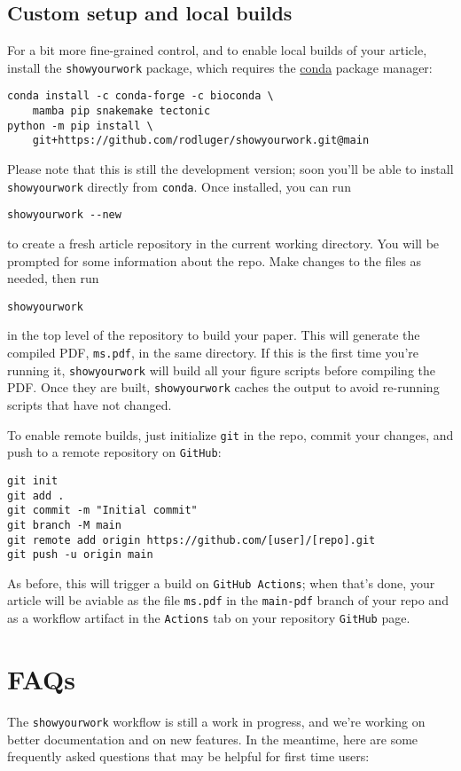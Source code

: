 \documentclass[twocolumn]{aastex631}
\begin{document}
{{\subsection{Custom setup and local builds}
%
For a bit more fine-grained control, and to enable local builds of your article, install the \texttt{showyourwork} package, which requires the \href{https://www.anaconda.com/products/individual}{conda} package manager:
%
\begin{verbatim}
conda install -c conda-forge -c bioconda \
    mamba pip snakemake tectonic
python -m pip install \
    git+https://github.com/rodluger/showyourwork.git@main
\end{verbatim}
%
Please note that this is still the development version; soon you'll be able to install \texttt{showyourwork} directly from \texttt{conda}.
Once installed, you can run
%
\begin{verbatim}
showyourwork --new
\end{verbatim}
%
to create a fresh article repository in the current working directory.
You will be prompted for some information about the repo. Make changes to the files as needed, then run
%
\begin{verbatim}
showyourwork
\end{verbatim}
%
in the top level of the repository to build your paper.
This will generate the compiled PDF, \texttt{ms.pdf}, in the same directory.
If this is the first time you're running it, \texttt{showyourwork} will build all your figure scripts before compiling the PDF.
Once they are built, \texttt{showyourwork} caches the output to avoid re-running scripts that have not changed.

To enable remote builds, just initialize \texttt{git} in the repo, commit your changes, and push to a remote repository on \texttt{GitHub}:
%
\begin{verbatim}
git init
git add .
git commit -m "Initial commit"
git branch -M main
git remote add origin https://github.com/[user]/[repo].git
git push -u origin main
\end{verbatim}
%
As before, this will trigger a build on \texttt{GitHub Actions}; when that's done, your article will be aviable as the file \texttt{ms.pdf} in the \texttt{main-pdf} branch of your repo and as a workflow artifact in the \texttt{Actions} tab on your repository \texttt{GitHub} page.

\section{FAQs}
%
The \texttt{showyourwork} workflow is still a work in progress, and we're working on better documentation and on new features.
In the meantime, here are some frequently asked questions that may be helpful for first time users:

}}
\end{document}
